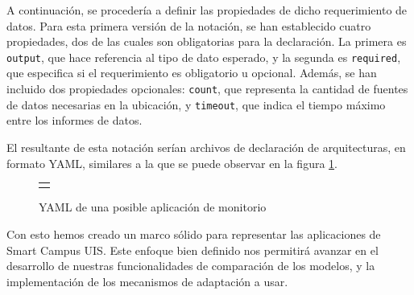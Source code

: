 A continuación, se procedería a definir las propiedades de dicho requerimiento de datos. Para esta primera versión de la notación, se han establecido cuatro propiedades, dos de las cuales son obligatorias para la declaración. La primera es \texttt{output}, que hace referencia al tipo de dato esperado, y la segunda es \texttt{required}, que especifica si el requerimiento es obligatorio u opcional. Además, se han incluido dos propiedades opcionales: \texttt{count}, que representa la cantidad de fuentes de datos necesarias en la ubicación, y \texttt{timeout}, que indica el tiempo máximo entre los informes de datos.

El resultante de esta notación serían archivos de declaración de arquitecturas, en formato YAML, similares a la que se puede observar en la figura \ref{fig:YAML-ADL}.

\begin{figure}[H]
    \centering
    \caption{YAML de una posible aplicación de monitorio}
    \label{fig:YAML-ADL}
    \begin{tabular}{c}
        \setstretch{1}
        \small
        
    \end{tabular}
\end{figure}

Con esto hemos creado un marco sólido para representar las aplicaciones de Smart Campus UIS. Este enfoque bien definido nos permitirá avanzar en el desarrollo de nuestras funcionalidades de comparación de los modelos, y la implementación de los mecanismos de adaptación a usar. 